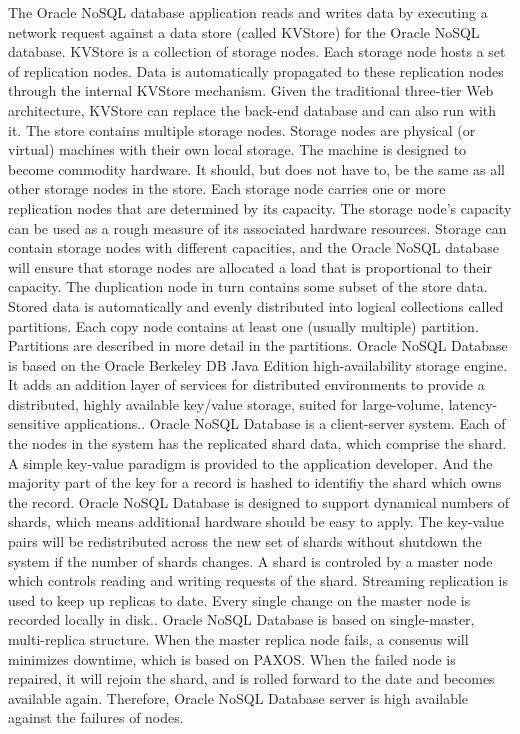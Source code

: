 The Oracle NoSQL database application reads and writes data by executing a network request against a data store (called KVStore) for the Oracle NoSQL database. KVStore is a collection of storage nodes. Each storage node hosts a set of replication nodes. Data is automatically propagated to these replication nodes through the internal KVStore mechanism. Given the traditional three-tier Web architecture, KVStore can replace the back-end database and can also run with it.
The store contains multiple storage nodes. Storage nodes are physical (or virtual) machines with their own local storage. The machine is designed to become commodity hardware. It should, but does not have to, be the same as all other storage nodes in the store.
Each storage node carries one or more replication nodes that are determined by its capacity. The storage node's capacity can be used as a rough measure of its associated hardware resources. Storage can contain storage nodes with different capacities, and the Oracle NoSQL database will ensure that storage nodes are allocated a load that is proportional to their capacity.
The duplication node in turn contains some subset of the store data. Stored data is automatically and evenly distributed into logical collections called partitions. Each copy node contains at least one (usually multiple) partition. Partitions are described in more detail in the partitions.
Oracle NoSQL Database is based on the Oracle Berkeley DB Java Edition high-availability storage engine. It adds an addition layer of services for distributed environments to provide a distributed, highly available key/value storage, suited for large-volume, latency-sensitive applications.\cite{hid-sp18-515-editor00}.
Oracle NoSQL Database is a client-server system. Each of the nodes in the system has the replicated shard data, which comprise the shard. A simple key-value paradigm is provided to the application developer. And the majority part of the key for a record is hashed to identifiy the shard which owns the record. Oracle NoSQL Database is designed to support dynamical numbers of shards, which means additional hardware should be easy to apply. The key-value pairs will be redistributed across the new set of shards without shutdown the system if the number of shards changes. A shard is controled by a master node which controls reading and writing requests of the shard. Streaming replication is used to keep up replicas to date. Every single change on the master node is recorded locally in disk.\cite{hid-sp18-515-editor00}. 
Oracle NoSQL Database is based on single-master, multi-replica structure. When the master replica node fails, a consenus will minimizes downtime, which is based on PAXOS. When the failed node is repaired, it will rejoin the shard, and is rolled forward to the date and becomes available again. Therefore, Oracle NoSQL Database server is high available against the failures of nodes.
